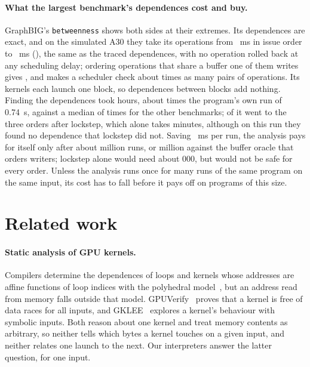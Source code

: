 \documentclass[11pt]{article}
\newcommand{\code}[1]{\texttt{#1}}
\begin{document}
\paragraph{What the largest benchmark's dependences cost and buy.} GraphBIG's \code{betweenness} shows both
sides at their extremes. Its dependences are exact, and on the simulated A30 they take its operations from
\numBtwSeqMs{}~ms in issue order to \numBtwHyMs{}~ms (\numBtwHy{}), the same as the traced dependences, with no
operation rolled back at any scheduling delay; ordering operations that share a buffer one of them writes gives
\numBtwBufRw{}, and makes a scheduler check about \numBtwPairsFewer{} times as many pairs of operations. Its kernels
each launch one block, so dependences between blocks add nothing. Finding the dependences took
\numBenchHyAloneHours{} hours, about \numBtwNativeX{} times the program's own run of 0.74~s, against a median of
\numBtwOthersNativeX{} times for the other benchmarks; \numBtwOrdersShare{} of it went to the three orders after
lockstep, which alone takes \numBtwLockstepMin{} minutes, although on this run they found no dependence that
lockstep did not. Saving \numBtwSaveMs{}~ms per run, the analysis pays for itself only after about
\numBtwBreakEven{} million runs, or \numBtwBreakEvenRw{} million against the buffer oracle that orders writers;
lockstep alone would need about \numBtwBreakEvenLock{}{,}000, but would not be safe for every order. Unless the
analysis runs once for many runs of the same program on the same input, its cost has to fall before it pays off
on programs of this size.

\clearpage
\section{Related work}
\label{sec:related}

\paragraph{Static analysis of GPU kernels.} Compilers determine the dependences of loops and kernels whose
addresses are affine functions of loop indices with the polyhedral model~\cite{Feautrier1991Dataflow,grosser2012polly},
but an address read from memory falls outside that model. GPUVerify~\cite{Betts2012GPUVerify} proves that a kernel
is free of data races for all inputs, and GKLEE~\cite{Li2012GKLEE} explores a kernel's behaviour with symbolic
inputs. Both reason about one kernel and treat memory contents as arbitrary, so neither tells which bytes a kernel
touches on a given input, and neither relates one launch to the next. Our interpreters answer the latter question,
for one input.
\end{document}
